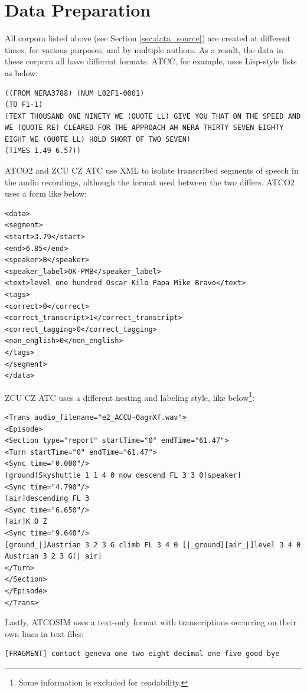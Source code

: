 \documentclass[12pt]{article}
\begin{document}
\section{Data Preparation}\label{sec:data_preparation}
All corpora listed above (see Section \ref{sec:data_source}) are created at different times, for various purposes, and by multiple authors. As a
result, the data in these corpora all have different formats. ATCC, for example, uses Lisp-style lists as below:

\begin{lstlisting}
((FROM NERA3788) (NUM L02F1-0001)
(TO F1-1)
(TEXT THOUSAND ONE NINETY WE (QUOTE LL) GIVE YOU THAT ON THE SPEED AND WE (QUOTE RE) CLEARED FOR THE APPROACH AH NERA THIRTY SEVEN EIGHTY EIGHT WE (QUOTE LL) HOLD SHORT OF TWO SEVEN)
(TIMES 1.49 6.57))
\end{lstlisting}

ATCO2 and ZCU CZ ATC use XML to isolate transcribed segments of speech in the audio recordings, although the format used between the two differs.
ATCO2 uses a form like below:

\clearpage
\begin{lstlisting}
<data>
<segment>
<start>3.79</start>
<end>6.85</end>
<speaker>B</speaker>
<speaker_label>OK-PMB</speaker_label>
<text>level one hundred Oscar Kilo Papa Mike Bravo</text>
<tags>
<correct>0</correct>
<correct_transcript>1</correct_transcript>
<correct_tagging>0</correct_tagging>
<non_english>0</non_english>
</tags>
</segment>
</data>
\end{lstlisting}

\clearpage
ZCU CZ ATC uses a different nesting and labeling style, like below\footnote{Some information is excluded for readability.}:

\begin{lstlisting}
<Trans audio_filename="e2_ACCU-0agmXf.wav">
<Episode>
<Section type="report" startTime="0" endTime="61.47">
<Turn startTime="0" endTime="61.47">
<Sync time="0.000"/>
[ground]Skyshuttle 1 1 4 0 now descend FL 3 3 0[speaker]
<Sync time="4.790"/>
[air]descending FL 3
<Sync time="6.650"/>
[air]K O Z
<Sync time="9.640"/>
[ground_|]Austrian 3 2 3 G climb FL 3 4 0 [|_ground][air_|]level 3 4 0 Austrian 3 2 3 G[|_air]
</Turn>
</Section>
</Episode>
</Trans>
\end{lstlisting}

Lastly, ATCOSIM uses a text-only format with transcriptions occurring on their own lines in text files:

\begin{lstlisting}
[FRAGMENT] contact geneva one two eight decimal one five good bye
\end{lstlisting}
\end{document}

